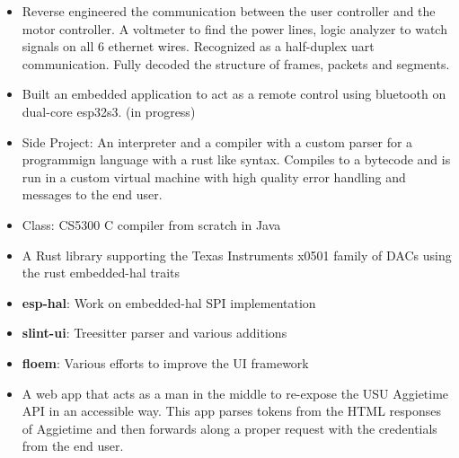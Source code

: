 \begin{itemize}
	\item Reverse engineered the communication between the user controller and the motor controller.
		A voltmeter to find the power lines, logic analyzer to watch signals on all 6 ethernet wires.
		Recognized as a half-duplex uart communication. Fully decoded the structure of frames, packets and
		segments.
	\item Built an embedded application to act as a remote control using bluetooth on dual-core esp32s3. (in progress)
\end{itemize}
\smallskip
{}
\begin{itemize}
    \item Side Project: An interpreter and a compiler with a custom parser for a programmign language with a
		rust like syntax. Compiles to a bytecode and is run in a custom virtual machine with high quality
		error handling and messages to the end user.
	\item Class: CS5300 C compiler from scratch in Java
\end{itemize}
\smallskip
{}
\begin{itemize}
    \item A Rust library supporting the Texas Instruments x0501 family of DACs using the
        rust embedded-hal traits
\end{itemize}
\smallskip
{}
\begin{itemize}
    \item \textbf{esp-hal}: Work on embedded-hal SPI implementation
    \item \textbf{slint-ui}: Treesitter parser and various additions
    \item \textbf{floem}: Various efforts to improve the UI framework
\end{itemize}
\smallskip
{}
\begin{itemize}
	\item A web app that acts as a man in the middle to
		re-expose the USU Aggietime API in an accessible way. This app parses
		tokens from the HTML responses of Aggietime and then forwards along a
		proper request with the credentials from the end user.
\end{itemize}

